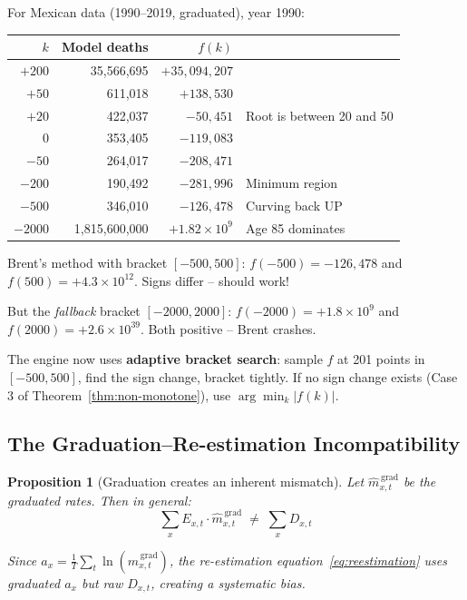 \documentclass[11pt,a4paper]{article}
\newtheorem{proposition}[theorem]{Proposition}
\theoremstyle{definition}
\begin{document}
\begin{application}
For Mexican data (1990--2019, graduated), year 1990:

\begin{center}
\begin{tabular}{rrrl}
\toprule
$k$ & Model deaths & $f(k)$ & \\
\midrule
$+200$ & 35{,}566{,}695 & $+35{,}094{,}207$ & \\
$+50$ & 611{,}018 & $+138{,}530$ & \\
$+20$ & 422{,}037 & $-50{,}451$ & Root is between 20 and 50 \\
$0$ & 353{,}405 & $-119{,}083$ & \\
$-50$ & 264{,}017 & $-208{,}471$ & \\
$-200$ & 190{,}492 & $-281{,}996$ & Minimum region \\
$-500$ & 346{,}010 & $-126{,}478$ & Curving back UP \\
$-2000$ & 1{,}815{,}600{,}000 & $+1.82 \times 10^9$ & Age 85 dominates \\
\bottomrule
\end{tabular}
\end{center}

Brent's method with bracket $[-500, 500]$: $f(-500) = -126{,}478$ and
$f(500) = +4.3 \times 10^{12}$. Signs differ -- should work!

But the \emph{fallback} bracket $[-2000, 2000]$: $f(-2000) = +1.8 \times 10^9$
and $f(2000) = +2.6 \times 10^{39}$. Both positive -- Brent crashes.

The engine now uses \textbf{adaptive bracket search}: sample $f$ at 201
points in $[-500, 500]$, find the sign change, bracket tightly. If no
sign change exists (Case 3 of Theorem~\ref{thm:non-monotone}), use
$\arg\min_k |f(k)|$.
\end{application}

\subsection{The Graduation--Re-estimation Incompatibility}

\begin{proposition}[Graduation creates an inherent mismatch]
\label{prop:mismatch}
Let $\hat{m}_{x,t}^{\,\text{grad}}$ be the graduated rates. Then in general:
\begin{equation}
  \sum_x E_{x,t} \cdot \hat{m}_{x,t}^{\,\text{grad}} \;\neq\; \sum_x D_{x,t}
\end{equation}

Since $a_x = \frac{1}{T}\sum_t \ln(\hat{m}_{x,t}^{\,\text{grad}})$, the
re-estimation equation~\eqref{eq:reestimation} uses graduated $a_x$ but
raw $D_{x,t}$, creating a systematic bias.
\end{proposition}
\end{document}
